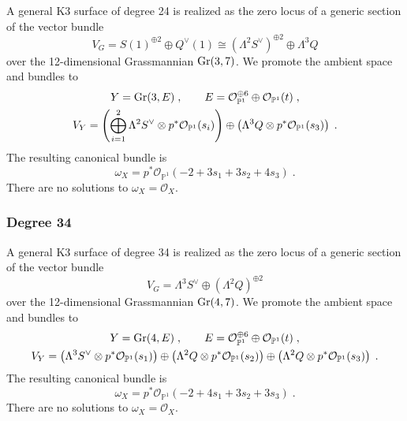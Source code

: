 \documentclass[11pt,a4paper]{article}
\numberwithin{equation}{section}
\numberwithin{table}{section}\setlength{\multlinegap}{25pt}
\begin{document}
A general K3 surface of degree 24 is realized as the zero locus of a generic section of the vector bundle~\cite{Mukai5}
\begin{equation}
    \label{eq:Degree24FiberDefiningBundle}
    V_G=S(1)^{\oplus 2}\oplus Q^\vee (1)\cong \left(\Lambda^2 S^\vee\right)^{\oplus 2}\oplus \Lambda^3 Q
\end{equation}
over the 12-dimensional Grassmannian $\textup{Gr}(3,7)$. We promote the ambient space and bundles to
\begin{equation}
    \begin{gathered}
        Y = \textup{Gr}(3,E)\;,\qquad E = \mathcal{O}_{\mathbb{P}^1}^{\oplus 6}\oplus \mathcal{O}_{\mathbb{P}^1}(t)\;,\\
    V_Y=\left(\bigoplus_{i=1}^2\Lambda^2 S^\vee\otimes p^*\mathcal{O}_{\mathbb{P}^1}(s_i)\right)\oplus \left(\Lambda^3 Q\otimes p^*\mathcal{O}_{\mathbb{P}^1}(s_3)\right)\;.
    \end{gathered}
\end{equation}
The resulting canonical bundle is
\begin{equation}
    \omega_X=p^*\mathcal{O}_{\mathbb{P}^1}(-2+3s_1+3s_2+4s_3)\;.
\end{equation}
There are no solutions to $\omega_X=\mathcal{O}_X$.

\subsubsection*{Degree 34}

A general K3 surface of degree 34 is realized as the zero locus of a generic section of the vector bundle~\cite{Mukai5}
\begin{equation}
    \label{eq:Degree34FiberDefiningBundle}
    V_G=\Lambda^3S^\vee\oplus (\Lambda^2Q)^{\oplus 2}
\end{equation}
over the 12-dimensional Grassmannian $\textup{Gr}(4,7)$. We promote the ambient space and bundles to
\begin{equation}
    \begin{gathered}
    Y = \textup{Gr}(4,E)\;,\qquad E = \mathcal{O}_{\mathbb{P}^1}^{\oplus 6}\oplus \mathcal{O}_{\mathbb{P}^1}(t)\;,\\
    V_Y=\left(\Lambda^3S^\vee\otimes p^*\mathcal{O}_{\mathbb{P}^1}(s_1)\right)\oplus \left(\Lambda^2Q\otimes p^*\mathcal{O}_{\mathbb{P}^1}(s_2)\right)\oplus \left(\Lambda^2Q\otimes p^*\mathcal{O}_{\mathbb{P}^1}(s_3)\right)\;.
    \end{gathered}
\end{equation}
The resulting canonical bundle is
\begin{equation}
    \omega_X=p^*\mathcal{O}_{\mathbb{P}^1}(-2+4s_1+3s_2+3s_3)\;.
\end{equation}
There are no solutions to $\omega_X=\mathcal{O}_X$.
\end{document}
